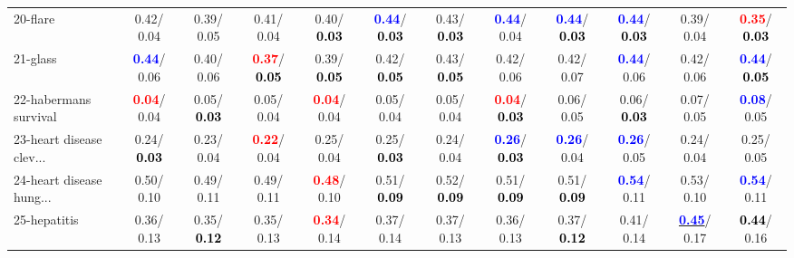 \begin{table}[h]
\begin{center}
{\begin{tabular}{lc|c|c|c|c|c|c|c|c|c|c}
20-flare &   0.42/  0.04 &   0.39/  0.05 &   0.41/  0.04 &   0.40/\textcolor{black}{\textbf{  0.03}} & \textcolor{blue}{\textbf{  0.44}}/\textcolor{black}{\textbf{  0.03}} &   0.43/\textcolor{black}{\textbf{  0.03}} & \textcolor{blue}{\textbf{  0.44}}/  0.04 & \textcolor{blue}{\textbf{  0.44}}/\textcolor{black}{\textbf{  0.03}} & \textcolor{blue}{\textbf{  0.44}}/\textcolor{black}{\textbf{  0.03}} &   0.39/  0.04 & \textcolor{red}{\textbf{  0.35}}/\textcolor{black}{\textbf{  0.03}} \\
21-glass & \textcolor{blue}{\textbf{  0.44}}/  0.06 &   0.40/  0.06 & \textcolor{red}{\textbf{  0.37}}/\textcolor{black}{\textbf{  0.05}} &   0.39/\textcolor{black}{\textbf{  0.05}} &   0.42/\textcolor{black}{\textbf{  0.05}} &   0.43/\textcolor{black}{\textbf{  0.05}} &   0.42/  0.06 &   0.42/  0.07 & \textcolor{blue}{\textbf{  0.44}}/  0.06 &   0.42/  0.06 & \textcolor{blue}{\textbf{  0.44}}/\textcolor{black}{\textbf{  0.05}} \\ \hline
22-habermans survival & \textcolor{red}{\textbf{  0.04}}/  0.04 &   0.05/\textcolor{black}{\textbf{  0.03}} &   0.05/  0.04 & \textcolor{red}{\textbf{  0.04}}/  0.04 &   0.05/  0.04 &   0.05/  0.04 & \textcolor{red}{\textbf{  0.04}}/\textcolor{black}{\textbf{  0.03}} &   0.06/  0.05 &   0.06/\textcolor{black}{\textbf{  0.03}} &   0.07/  0.05 & \textcolor{blue}{\textbf{  0.08}}/  0.05 \\
23-heart disease clev... &   0.24/\textcolor{black}{\textbf{  0.03}} &   0.23/  0.04 & \textcolor{red}{\textbf{  0.22}}/  0.04 &   0.25/  0.04 &   0.25/\textcolor{black}{\textbf{  0.03}} &   0.24/  0.04 & \textcolor{blue}{\textbf{  0.26}}/\textcolor{black}{\textbf{  0.03}} & \textcolor{blue}{\textbf{  0.26}}/  0.04 & \textcolor{blue}{\textbf{  0.26}}/  0.05 &   0.24/  0.04 &   0.25/  0.05 \\
24-heart disease hung... &   0.50/  0.10 &   0.49/  0.11 &   0.49/  0.11 & \textcolor{red}{\textbf{  0.48}}/  0.10 &   0.51/\textcolor{black}{\textbf{  0.09}} &   0.52/\textcolor{black}{\textbf{  0.09}} &   0.51/\textcolor{black}{\textbf{  0.09}} &   0.51/\textcolor{black}{\textbf{  0.09}} & \textcolor{blue}{\textbf{  0.54}}/  0.11 &   0.53/  0.10 & \textcolor{blue}{\textbf{  0.54}}/  0.11 \\
25-hepatitis &   0.36/  0.13 &   0.35/\textcolor{black}{\textbf{  0.12}} &   0.35/  0.13 & \textcolor{red}{\textbf{  0.34}}/  0.14 &   0.37/  0.14 &   0.37/  0.13 &   0.36/  0.13 &   0.37/\textcolor{black}{\textbf{  0.12}} &   0.41/  0.14 & \underline{\textcolor{blue}{\textbf{  0.45}}}/  0.17 & \textcolor{black}{\textbf{  0.44}}/  0.16 \\

\end{tabular}}
\end{center}
\end{table}
